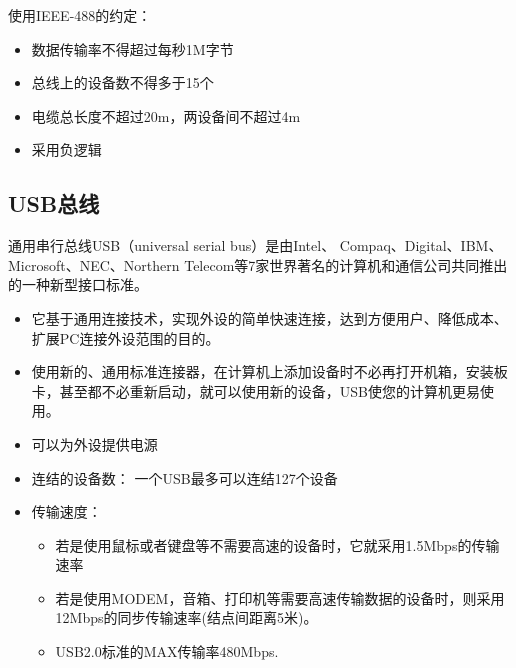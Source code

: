 使用IEEE-488的约定：

\begin{itemize}

\item 数据传输率不得超过每秒1M字节
\item 总线上的设备数不得多于15个
\item 电缆总长度不超过20m，两设备间不超过4m
\item 采用负逻辑


\end{itemize}

\subsection{USB总线}

通用串行总线USB（universal serial bus）是由Intel、 Compaq、Digital、IBM、Microsoft、NEC、Northern Telecom等7家世界著名的计算机和通信公司共同推出的一种新型接口标准。

\begin{itemize}


\item 它基于通用连接技术，实现外设的简单快速连接，达到方便用户、降低成本、扩展PC连接外设范围的目的。
\item 使用新的、通用标准连接器，在计算机上添加设备时不必再打开机箱，安装板卡，甚至都不必重新启动，就可以使用新的设备，USB使您的计算机更易使用。

\item 可以为外设提供电源


\end{itemize}

\begin{itemize}

\item 连结的设备数：
一个USB最多可以连结127个设备

\item 传输速度：


\begin{itemize}
\item 若是使用鼠标或者键盘等不需要高速的设备时，它就采用1.5Mbps的传输速率
\item 若是使用MODEM，音箱、打印机等需要高速传输数据的设备时，则采用12Mbps的同步传输速率(结点间距离5米)。
\item USB2.0标准的MAX传输率480Mbps.


\end{itemize}

\end{itemize}

